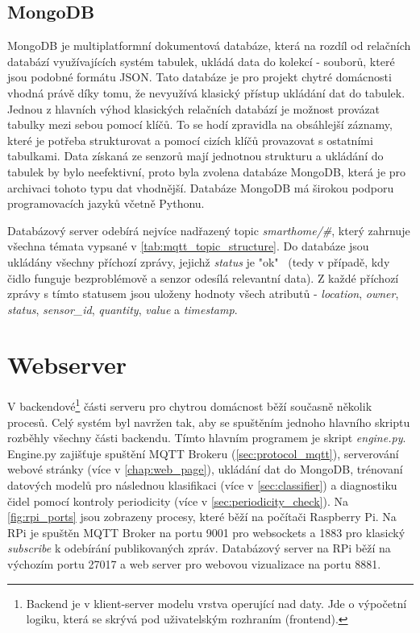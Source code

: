 \subsection*{MongoDB}
MongoDB je multiplatformní dokumentová databáze, která na rozdíl od relačních databází využívajících systém tabulek, ukládá data do kolekcí - souborů, které jsou podobné formátu JSON. Tato databáze je pro projekt chytré domácnosti vhodná právě díky tomu, že nevyužívá klasický přístup ukládání dat do tabulek. Jednou z hlavních výhod klasických relačních databází je možnost provázat tabulky mezi sebou pomocí klíčů. To se hodí zpravidla na obsáhlejší záznamy, které je potřeba strukturovat a pomocí cizích klíčů provazovat s ostatními tabulkami. Data získaná ze senzorů mají jednotnou strukturu a ukládání do tabulek by bylo neefektivní, proto byla zvolena databáze MongoDB, která je pro archivaci tohoto typu dat vhodnější. Databáze MongoDB má širokou podporu programovacích jazyků včetně Pythonu. \par
Databázový server odebírá nejvíce nadřazený topic \textit{smarthome/\#}, který zahrnuje všechna témata vypsané v \cref{tab:mqtt_topic_structure}. Do databáze jsou ukládány všechny příchozí zprávy, jejichž \textit{status} je "ok" \ (tedy v případě, kdy čidlo funguje bezproblémově a senzor odesílá relevantní data). Z každé příchozí zprávy s tímto statusem jsou uloženy hodnoty všech atributů - \textit{location}, \textit{owner}, \textit{status}, \textit{sensor\_id}, \textit{quantity}, \textit{value} a \textit{timestamp}. \par

\section{Webserver} \label{sec:webserver}

V backendové\footnote{Backend je v klient-server modelu vrstva operující nad daty. Jde o výpočetní logiku, která se skrývá pod uživatelským rozhraním (frontend).} části serveru pro chytrou domácnost běží současně několik procesů. Celý systém byl navržen tak, aby se spuštěním jednoho hlavního skriptu rozběhly všechny části backendu. Tímto hlavním programem je skript \textit{engine.py}. Engine.py zajišťuje spuštění MQTT Brokeru (\cref{sec:protocol_mqtt}), serverování webové stránky (více v \cref{chap:web_page}), ukládání dat do MongoDB, trénovaní datových modelů pro následnou klasifikaci (více v \cref{sec:classifier}) a diagnostiku čidel pomocí kontroly periodicity (více v \cref{sec:periodicity_check}).  Na \cref{fig:rpi_ports} jsou zobrazeny procesy, které běží na počítači Raspberry Pi. Na RPi je spuštěn MQTT Broker na portu 9001 pro websockets a 1883 pro klasický \textit{subscribe} k odebírání publikovaných zpráv. Databázový server na RPi běží na výchozím portu 27017 a web server pro webovou vizualizace na portu 8881. 

